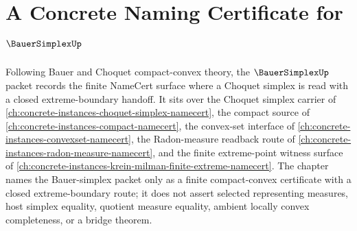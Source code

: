 \chapter{A Concrete Naming Certificate for $\BauerSimplexUp$}
\label{ch:concrete-instances-bauer-simplex-namecert}

Following Bauer and Choquet compact-convex theory, the $\BauerSimplexUp$
packet records the finite NameCert surface where a Choquet simplex is read with
a closed extreme-boundary handoff. It sits over the Choquet simplex carrier of
\autoref{ch:concrete-instances-choquet-simplex-namecert}, the compact source of
\autoref{ch:concrete-instances-compact-namecert}, the convex-set interface of
\autoref{ch:concrete-instances-convexset-namecert}, the Radon-measure readback
route of \autoref{ch:concrete-instances-radon-measure-namecert}, and the finite
extreme-point witness surface of
\autoref{ch:concrete-instances-krein-milman-finite-extreme-namecert}. The
chapter names the Bauer-simplex packet only as a finite compact-convex
certificate with a closed extreme-boundary route; it does not assert selected
representing measures, host simplex equality, quotient measure equality,
ambient locally convex completeness, or a bridge theorem.

